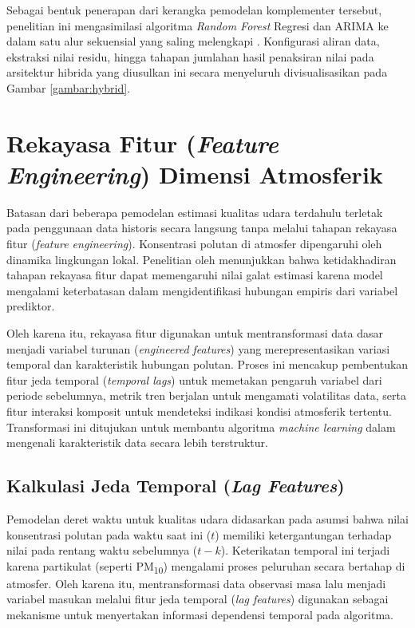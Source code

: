Sebagai bentuk penerapan dari kerangka pemodelan komplementer tersebut, penelitian ini mengasimilasi algoritma \textit{Random Forest} Regresi dan ARIMA ke dalam satu alur sekuensial yang saling melengkapi \autocite{yenkikar2025explainable}. Konfigurasi aliran data, ekstraksi nilai residu, hingga tahapan jumlahan hasil penaksiran nilai pada arsitektur hibrida yang diusulkan ini secara menyeluruh divisualisasikan pada Gambar \ref{gambar:hybrid}.

\section{Rekayasa Fitur (\textit{Feature Engineering}) Dimensi Atmosferik}

Batasan dari beberapa pemodelan estimasi kualitas udara terdahulu terletak pada penggunaan data historis secara langsung tanpa melalui tahapan rekayasa fitur (\textit{feature engineering}). Konsentrasi polutan di atmosfer dipengaruhi oleh dinamika lingkungan lokal. Penelitian oleh \textcite{naz2024two} menunjukkan bahwa ketidakhadiran tahapan rekayasa fitur dapat memengaruhi nilai galat estimasi karena model mengalami keterbatasan dalam mengidentifikasi hubungan empiris dari variabel prediktor.

Oleh karena itu, rekayasa fitur digunakan untuk mentransformasi data dasar menjadi variabel turunan (\textit{engineered features}) yang merepresentasikan variasi temporal dan karakteristik hubungan polutan. Proses ini mencakup pembentukan fitur jeda temporal (\textit{temporal lags}) untuk memetakan pengaruh variabel dari periode sebelumnya, metrik tren berjalan untuk mengamati volatilitas data, serta fitur interaksi komposit untuk mendeteksi indikasi kondisi atmosferik tertentu. Transformasi ini ditujukan untuk membantu algoritma \textit{machine learning} dalam mengenali karakteristik data secara lebih terstruktur.

\subsection{Kalkulasi Jeda Temporal (\textit{Lag Features})}

Pemodelan deret waktu untuk kualitas udara didasarkan pada asumsi bahwa nilai konsentrasi polutan pada waktu saat ini ($t$) memiliki ketergantungan terhadap nilai pada rentang waktu sebelumnya ($t-k$). Keterikatan temporal ini terjadi karena partikulat (seperti PM\textsubscript{10}) mengalami proses peluruhan secara bertahap di atmosfer. Oleh karena itu, mentransformasi data observasi masa lalu menjadi variabel masukan melalui fitur jeda temporal (\textit{lag features}) digunakan sebagai mekanisme untuk menyertakan informasi dependensi temporal pada algoritma.

